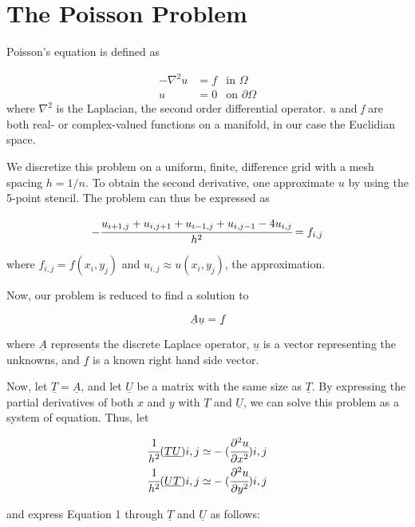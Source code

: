 \section{The Poisson Problem}

Poisson's equation is defined as

\begin{align}
  - \nabla ^2 u &= f &\text{in~} \Omega \\
  u &= 0 &\text{on~} \partial\Omega
\end{align}
where $\nabla^2$ is the Laplacian, the second order differential
operator. {\em u} and {\em f} are both real- or complex-valued functions on a
manifold, in our case the Euclidian space.

We discretize this problem on a uniform, finite, difference grid with a mesh
spacing $h = 1/n$. To obtain the second derivative, one approximate $u$ by using
the 5-point stencil. The problem can thus be expressed as

\begin{equation}
  -\cfrac{u_{i+1, j} + u_{i, j+1} +u_{i-1, j} +u_{i, j-1} - 4u_{i, j}}{h^2} =
  f_{i,j}
\end{equation}

where $f_{i,j} = f(x_i, y_j)$ and $u_{i,j} \approx u(x_i, y_j)$, the
approximation.

Now, our problem is reduced to find a solution to

\begin{equation}
  \underline A \underline u = \underline f
\end{equation}

where $\underline A$ represents the discrete Laplace operator, $\underline u$ is
a vector representing the unknowns, and $\underline f$ is a known right hand
side vector.

Now, let $\underline T = \underline A$, and let $\underline U$ be a matrix with
the same size as $\underline T$. By expressing the partial derivatives of both
$x$ and $y$ with $\underline T$ and $\underline U$, we can solve this problem as
a system of equation. Thus, let

\begin{align}
  \cfrac{1}{h^2}(\underline{TU})i,j \simeq& -(\cfrac{\partial^2u}{\partial x^2})i,j \\
  \cfrac{1}{h^2}(\underline{UT})i,j \simeq& -(\cfrac{\partial^2u}{\partial y^2})i,j
\end{align}

and express Equation 1 through $\underline T$ and $\underline U$ as follows:

